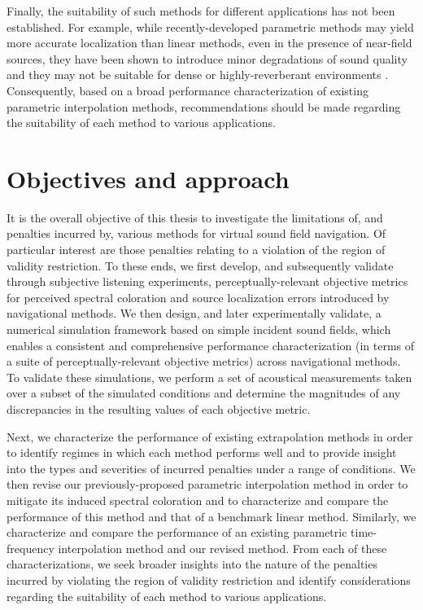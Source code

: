 Finally, the suitability of such methods for different applications has not been established.
For example, while recently-developed parametric methods may yield more accurate localization than linear methods, even in the presence of near-field sources, they have been shown to introduce minor degradations of sound quality \citep[section 5.3]{Zheng2013PhD} and they may not be suitable for dense or highly-reverberant environments \citep[section II]{Thiergart2013}.
Consequently, based on a broad performance characterization of existing parametric interpolation methods, recommendations should be made regarding the suitability of each method to various applications.

\section{Objectives and approach}
It is the overall objective of this thesis to investigate the limitations of, and penalties incurred by, various methods for virtual sound field navigation.
Of particular interest are those penalties relating to a violation of the region of validity restriction.
To these ends, we first develop, and subsequently validate through subjective listening experiments, perceptually-relevant objective metrics for perceived spectral coloration and source localization errors introduced by navigational methods. %
We then design, and later experimentally validate, a numerical simulation framework based on simple incident sound fields, which enables a consistent and comprehensive performance characterization (in terms of a suite of perceptually-relevant objective metrics) across navigational methods. %
To validate these simulations, we perform a set of acoustical measurements taken over a subset of the simulated conditions and determine the magnitudes of any discrepancies in the resulting values of each objective metric. %

Next, we characterize the performance of existing extrapolation methods in order to identify regimes in which each method performs well and to provide insight into the types and severities of incurred penalties under a range of conditions. %
We then revise our previously-proposed parametric interpolation method \citep{TylkaChoueiri2016} in order to mitigate its induced spectral coloration and to characterize and compare the performance of this method and that of a benchmark linear method. %
Similarly, we characterize and compare the performance of an existing parametric time-frequency interpolation method and our revised method. %
From each of these characterizations, we seek broader insights into the nature of the penalties incurred by violating the region of validity restriction and identify considerations regarding the suitability of each method to various applications. %

